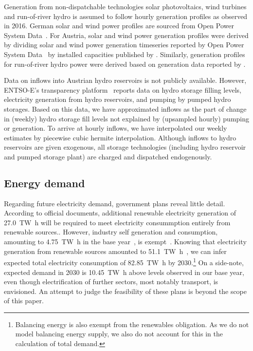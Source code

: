 \documentclass[review, 3p, times]{elsarticle} %
\begin{document}
    Generation from non-dispatchable technologies solar photovoltaics, wind turbines and run-of-river hydro is assumed
    to follow hourly generation profiles as observed in 2016.
    German solar and wind power profiles are sourced from Open Power System Data~\citep{opsd2019}.
    For Austria, solar and wind power generation profiles were derived by dividing solar and wind power generation
    timeseries reported by Open Power System Data~\cite{opsd2019} by installed capacities published by \cite{Biermayr}.
    Similarly, generation profiles for run-of-river hydro power were derived based on generation data reported by
    \cite{ENTSOE2020}.

    Data on inflows into Austrian hydro reservoirs is not publicly available.
    However, ENTSO-E's transparency platform~\cite{ENTSOE2020} reports data on hydro storage filling levels, electricity
    generation from hydro reservoirs, and pumping by pumped hydro storages.
    Based on this data, we have approximated inflows as the part of change in (weekly) hydro storage fill levels not
    explained by (upsampled hourly) pumping or generation.
    To arrive at hourly inflows, we have interpolated our weekly estimates by piecewise cubic hermite interpolation.
    Although inflows to hydro reservoirs are given exogenous, all storage technologies (including hydro reservoir and
    pumped storage plant) are charged and dispatched endogenously.

    \subsection{Energy demand}\label{subsec:energy-demand}
    Regarding future electricity demand, government plans reveal little detail.
    According to official documents, additional renewable electricity generation of \SI{27.0}{\tera\watt\hour} will be
    required to meet electricity consummption entirely from renewable sources.\citep{Regierungsprogramm2020}.
    However, industry self generation and consumption, amounting to \SI{4.75}{\tera\watt\hour} in the base
    year~\citep{StatistikAustria2020}, is exempt~\citep{mission2030}.
    Knowing that electricity generation from renewable sources amounted to
    \SI{51.1}{\tera\watt\hour}~\citep{StatistikAustria2020}, we can infer expected total electricity consumption of
    \SI{82.85}{\tera\watt\hour} by 2030.\footnote{Balancing energy is also exempt from the renewables obligation.
    As we do not model balancing energy supply, we also do not account for this in the calculation of total demand.}
    On a side-note, expected demand in 2030 is \SI{10.45}{\tera\watt\hour} above levels observed in our base year, even
    though electrification of further sectors, most notably transport, is envisioned.
    An attempt to judge the feasibility of these plans is beyond the scope of this paper.
\end{document}

